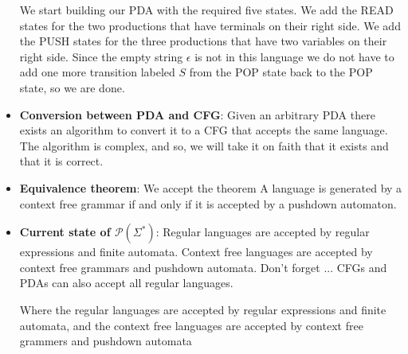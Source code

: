 \documentclass{report}
\begin{document}
\begin{itemize}
            \bigbreak \noindent 
            We start building our PDA with the required five states.
            \bigbreak \noindent 
            We add the READ states for the two productions that have terminals on their right side.
            \bigbreak \noindent 
            We add the PUSH states for the three productions that have two variables on their right side.
            \bigbreak \noindent 
            Since the empty string $\epsilon$ is not in this language we do not have to add one more transition labeled $S$ from the POP state back to the POP state, so we are done.
        \item \textbf{Conversion between PDA and CFG}: Given an arbitrary PDA there exists an algorithm to convert it to a CFG that accepts the same language.
            \bigbreak \noindent 
            The algorithm is complex, and so, we will take it on faith that it exists and that it is correct.
        \item \textbf{Equivalence theorem}: We accept the theorem
            \bigbreak \noindent 
            A language is generated by a context free grammar if and only if it is accepted by a pushdown automaton.
        \item \textbf{Current state of  $\mathcal{P}(\Sigma^{*})$}:
            Regular languages are accepted by regular expressions and finite automata.
            \bigbreak \noindent 
            Context free languages are accepted by context free grammars and pushdown automata.
            \bigbreak \noindent 
            Don’t forget ... CFGs and PDAs can also accept all regular languages.
            \begin{figure}[ht]
                \centering
                \label{fig:rc1}
            \end{figure}
            \bigbreak \noindent 
            Where the regular languages are accepted by regular expressions and finite automata, and the context free languages are accepted by context free grammers and pushdown automata





    \end{itemize}

    \pagebreak 
\end{document}
